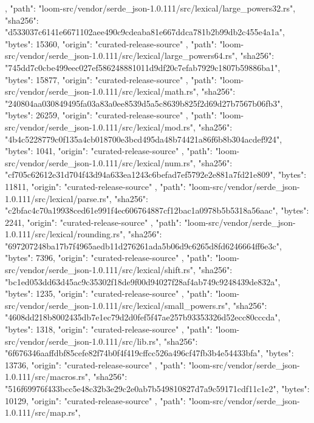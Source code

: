 {{    },
    {
      "path": "loom-src/vendor/serde_json-1.0.111/src/lexical/large_powers32.rs",
      "sha256": "d533037c6141e6671102aee490c9cdeaba81e667ddca781b2b99db2c455e4a1a",
      "bytes": 15360,
      "origin": "curated-release-source"
    },
    {
      "path": "loom-src/vendor/serde_json-1.0.111/src/lexical/large_powers64.rs",
      "sha256": "745dd7c0cbe499eec027ef586248881011d9df20c7efab7929c1807b59886ba1",
      "bytes": 15877,
      "origin": "curated-release-source"
    },
    {
      "path": "loom-src/vendor/serde_json-1.0.111/src/lexical/math.rs",
      "sha256": "240804aa030849495fa03a83a0ee8539d5a5c8639b825f2d69d27b7567b06fb3",
      "bytes": 26259,
      "origin": "curated-release-source"
    },
    {
      "path": "loom-src/vendor/serde_json-1.0.111/src/lexical/mod.rs",
      "sha256": "4b4c5228779c0f135a4cb018700e3bcd495da48b74421a86f6b8b304acdef924",
      "bytes": 1041,
      "origin": "curated-release-source"
    },
    {
      "path": "loom-src/vendor/serde_json-1.0.111/src/lexical/num.rs",
      "sha256": "cf705c62612e31d704f43d94a633ea1243c6befad7ef5792e2e881a7fd21e809",
      "bytes": 11811,
      "origin": "curated-release-source"
    },
    {
      "path": "loom-src/vendor/serde_json-1.0.111/src/lexical/parse.rs",
      "sha256": "c2bfac4c70a19938ced61e991f4ec606764887cf12bac1a0978b5b5318a56aac",
      "bytes": 2241,
      "origin": "curated-release-source"
    },
    {
      "path": "loom-src/vendor/serde_json-1.0.111/src/lexical/rounding.rs",
      "sha256": "697207248ba17b7f4965aedb11d276261ada5b06d9c6265d8fd6246664ff6e3c",
      "bytes": 7396,
      "origin": "curated-release-source"
    },
    {
      "path": "loom-src/vendor/serde_json-1.0.111/src/lexical/shift.rs",
      "sha256": "bc1ed053dd63d45ac9c35302f18de9f00d94027f28af4ab749c9248439de832a",
      "bytes": 1235,
      "origin": "curated-release-source"
    },
    {
      "path": "loom-src/vendor/serde_json-1.0.111/src/lexical/small_powers.rs",
      "sha256": "4608dd218b8002435db7e1ec79d2d0fef5f47ae257b93353326d52ecc80cccda",
      "bytes": 1318,
      "origin": "curated-release-source"
    },
    {
      "path": "loom-src/vendor/serde_json-1.0.111/src/lib.rs",
      "sha256": "6f676346aaffdbf85cefe82f74b0f4f419cffcc526a496cf47fb3b4e54433bfa",
      "bytes": 13736,
      "origin": "curated-release-source"
    },
    {
      "path": "loom-src/vendor/serde_json-1.0.111/src/macros.rs",
      "sha256": "516f69976f433bcc5e48c32b3e29c2e0ab7b549810827d7a9c59171cdf11c1e2",
      "bytes": 10129,
      "origin": "curated-release-source"
    },
    {
      "path": "loom-src/vendor/serde_json-1.0.111/src/map.rs",
}}
